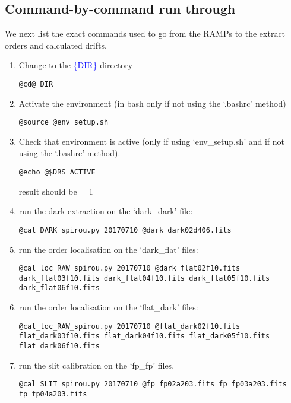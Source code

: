 \subsection{Command-by-command run through}

\noindent We next list the exact commands used to go from the RAMPs to the extract orders and calculated drifts.
\begin{enumerate}
\item Change to the \textcolor{blue}{\{DIR\}} directory
\begin{lstlisting}[style=bashstyle]
@cd@ DIR
\end{lstlisting}  

\item Activate the environment (in bash only if not using the `.bashrc' method)
\begin{lstlisting}[style=bashstyle]
@source @env_setup.sh
\end{lstlisting}  

\item Check that environment is active (only if using `env\_setup.sh' and if not using the `.bashrc' method).
\begin{lstlisting}[style=bashstyle]
@echo @$DRS_ACTIVE
\end{lstlisting}  

\noindent result should be = 1

\item run the dark extraction on the `dark\_dark' file:
\begin{lstlisting}[style=bashstyle]
@cal_DARK_spirou.py 20170710 @dark_dark02d406.fits
\end{lstlisting}  

\item run the order localisation on the `dark\_flat' files:
\begin{lstlisting}[style=bashstyle]
@cal_loc_RAW_spirou.py 20170710 @dark_flat02f10.fits dark_flat03f10.fits dark_flat04f10.fits dark_flat05f10.fits dark_flat06f10.fits
\end{lstlisting}  

\item run the order localisation on the `flat\_dark' files:
\begin{lstlisting}[style=bashstyle]
@cal_loc_RAW_spirou.py 20170710 @flat_dark02f10.fits flat_dark03f10.fits flat_dark04f10.fits flat_dark05f10.fits flat_dark06f10.fits
\end{lstlisting}  

\item run the slit calibration on the `fp\_fp' files.
\begin{lstlisting}[style=bashstyle]
@cal_SLIT_spirou.py 20170710 @fp_fp02a203.fits fp_fp03a203.fits fp_fp04a203.fits
\end{lstlisting}  


\end{enumerate}
